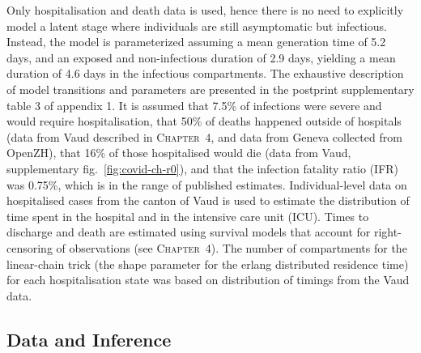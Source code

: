 Only hospitalisation and death data is used, hence there is no need to explicitly model a latent stage where individuals are still asymptomatic but infectious\cite[-8\baselineskip]{Ganyani:EstimatingGenerationInterval:2020,He:TemporalDynamicsViral:2020, Liu:ContributionPresymptomaticInfection:2020}. Instead, the model is parameterized assuming a mean generation time of 5.2 days\cite[-2\baselineskip]{Ganyani:EstimatingGenerationInterval:2020}, and an exposed and non-infectious duration of 2.9 days\cite[-1\baselineskip]{He:TemporalDynamicsViral:2020}, yielding a mean duration of 4.6 days in the infectious compartments. The exhaustive description of model transitions and parameters are presented in the postprint supplementary table 3 of appendix 1. It is assumed that 7.5\% of infections were severe and would require hospitalisation, that 50\% of deaths happened outside of hospitals (data from Vaud described in \textsc{Chapter~4}, and data from Geneva collected from OpenZH), that 16\% of those hospitalised would die (data from Vaud, supplementary fig.~\ref{fig:covid-ch-r0}), and that the infection fatality ratio (IFR) was 0.75\%, which is in the range of published estimates\cite[-4\baselineskip]{Verity:EstimatesSeverityCoronavirus:2020, Russell:EstimatingInfectionCase:2020}. Individual-level data on hospitalised cases from the canton of Vaud is used to estimate the distribution of time spent in the hospital and in the intensive care unit (ICU). Times to discharge and death are estimated using survival models that account for right-censoring of observations (see \textsc{Chapter~4}). The number of compartments for the linear-chain trick (\ie the shape parameter for the erlang distributed residence time)  for each hospitalisation state was based on distribution of timings from the Vaud data. 
\subsection{Data and Inference} 
